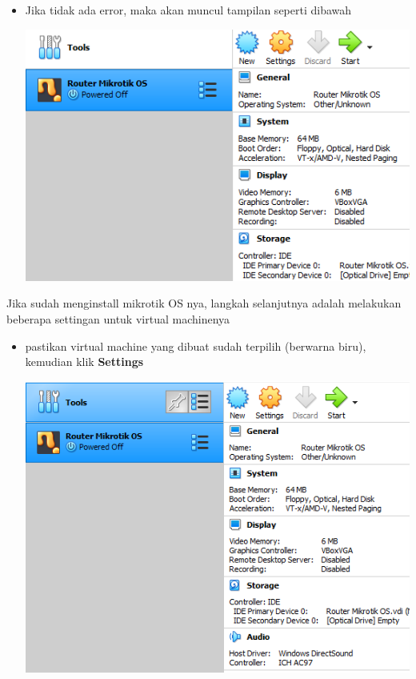 \documentclass{article}
\begin{document}
\begin{flushleft}
\begin{itemize}
        	\item Jika tidak ada error, maka akan muncul tampilan seperti dibawah \\
        		\begin{center}
        			\includegraphics[scale=0.6]{terakhir}
        		\end{center}
        		        	 
        \end{itemize}
        
        Jika sudah menginstall mikrotik OS nya, langkah selanjutnya adalah melakukan beberapa settingan untuk virtual machinenya
        
        \begin{itemize}
        	
			\item pastikan virtual machine yang dibuat sudah terpilih (berwarna biru), kemudian klik \textbf{Settings} 
				\begin{center}
					\includegraphics[scale=0.6]{(a)} 
				\end{center}
				

\end{itemize}
\end{flushleft}
\end{document}
